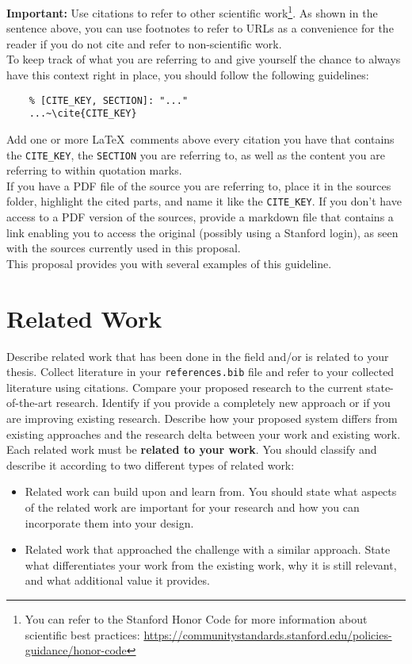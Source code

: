 \begin{tcolorbox}[breakable]
	\textbf{Important:} Use citations to refer to other scientific work\footnote{You can refer to the Stanford Honor Code for more information about scientific best practices: \url{https://communitystandards.stanford.edu/policies-guidance/honor-code}}.
	As shown in the sentence above, you can use footnotes to refer to URLs as a convenience for the reader if you do not cite and refer to non-scientific work.
	\\
	To keep track of what you are referring to and give yourself the chance to always have this context right in place, you should follow the following guidelines:
	\begin{verbatim}
	% [CITE_KEY, SECTION]: "..."
	...~\cite{CITE_KEY}
	\end{verbatim}
	Add one or more \LaTeX~comments above every citation you have that contains the \texttt{CITE\_KEY}, the \texttt{SECTION} you are referring to, as well as the content you are referring to within quotation marks.
	\\
	If you have a PDF file of the source you are referring to, place it in the sources folder, highlight the cited parts, and name it like the \texttt{CITE\_KEY}.
	If you don't have access to a PDF version of the sources, provide a markdown file that contains a link enabling you to access the original (possibly using a Stanford login), as seen with the sources currently used in this proposal.
	\\
	This proposal provides you with several examples of this guideline.
\end{tcolorbox}


\section*{Related Work}

\begin{tcolorbox}[breakable]
	Describe related work that has been done in the field and/or is related to your thesis. 
	Collect literature in your \texttt{references.bib} file and refer to your collected literature using citations. 
	Compare your proposed research to the current state-of-the-art research.
	Identify if you provide a completely new approach or if you are improving existing research. 
	Describe how your proposed system differs from existing approaches and the research delta between your work and existing work.
	\\
	Each related work must be \textbf{related to your work}.
	You should classify and describe it according to two different types of related work:
	\begin{itemize}
		\item Related work can build upon and learn from. You should state what aspects of the related work are important for your research and how you can incorporate them into your design.
		\item Related work that approached the challenge with a similar approach. State what differentiates your work from the existing work, why it is still relevant, and what additional value it provides.	
	\end{itemize}
\end{tcolorbox}

